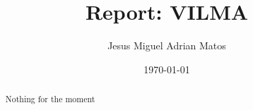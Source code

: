 \documentclass[]{article}
\title{Report: V{\small I}LMA}
\author{Jesus Miguel Adrian Matos}
\date{\today}
\begin{document}
\maketitle

\begin{abstract}
\noindent 
Nothing for the moment




\end{abstract}






\end{document}
